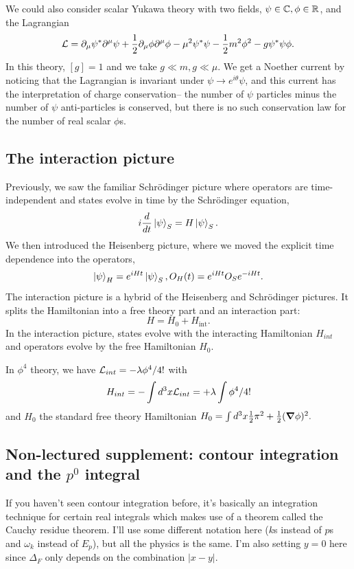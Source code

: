 \begin{exm}
We could also consider scalar Yukawa theory with two fields, $\psi\in \mathbb{C},\phi \in \mathbb{R}$, and the Lagrangian
$$\mathcal L=\partial_\mu \psi^* \partial^\mu \psi +\frac{1}{2}\partial_\mu \phi \partial^\mu \phi - \mu^2 \psi^*\psi -\frac{1}{2}m^2 \phi^2 - g\psi^* \psi \phi.$$
In this theory, $[g]=1$ and we take $g\ll m, g\ll \mu$. We get a Noether current by noticing that the Lagrangian is invariant under $\psi\to e^{i\theta}\psi$, and this current has the interpretation of charge conservation-- the number of $\psi$ particles minus the number of $\psi$ anti-particles is conserved, but there is no such conservation law for the number of real scalar $\phi$s.
\end{exm}

\subsection*{The interaction picture} Previously, we saw the familiar Schr\"odinger picture where operators are time-independent and states evolve in time by the Schr\"odinger equation,
$$i \frac{d}{dt}\left| \psi \right>_S=H\left| \psi \right>_S.$$
We then introduced the Heisenberg picture, where we moved the explicit time dependence into the operators,
$$\left| \psi \right>_H = e^{iHt}\left| \psi \right>_S, O_H(t)=e^{iHt} O_S e^{-iHt}.$$
The interaction picture is a hybrid of the Heisenberg and Schr\"odinger pictures. It splits the Hamiltonian into a free theory part and an interaction part:
$$H=H_0+H_{\text{int}}.$$
In the interaction picture, states evolve with the interacting Hamiltonian $H_{int}$ and operators evolve by the free Hamiltonian $H_0$.
\begin{exm}
In $\phi^4$ theory, we have $\mathcal L_{int}=-\lambda \phi^4/4!$ with $$H_{int}=-\int d^3x \mathcal L_{int}=+\lambda \int \phi^4/4!$$
and $H_0$ the standard free theory Hamiltonian
$H_0=\int d^3x \frac{1}{2}\pi^2+\frac{1}{2}(\mbox{\boldmath$ \nabla $} \phi)^2.$
\end{exm}

\subsection*{Non-lectured supplement: contour integration and the $p^0$ integral}
If you haven't seen contour integration before, it's basically an integration technique for certain real integrals which makes use of a theorem called the Cauchy residue theorem. I'll use some different notation here ($k$s instead of $p$s and $\omega_k$ instead of $E_p$), but all the physics is the same. I'm also setting $y=0$ here since $\Delta_F$ only depends on the combination $|x-y|$.


